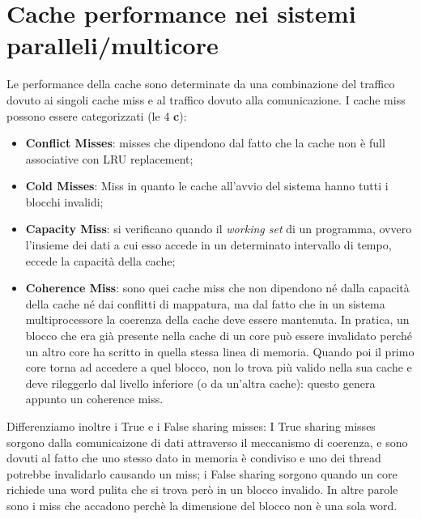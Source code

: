 \section{Cache performance nei sistemi paralleli/multicore}
Le performance della cache sono determinate da una combinazione del traffico dovuto ai singoli cache miss e al traffico dovuto alla comunicazione. I cache miss possono essere categorizzati (le 4 \textbf{c}):
\begin{itemize}
    \item \textbf{Conflict Misses}: misses che dipendono dal fatto che la cache non è full associative con LRU replacement;
    \item \textbf{Cold Misses}: Miss in quanto le cache all'avvio del sistema hanno tutti i blocchi invalidi;
    \item \textbf{Capacity Miss}: si verificano quando il \textit{working set} di un programma, ovvero l'insieme dei dati a cui esso accede in un determinato intervallo di tempo, eccede la capacità della cache;
    \item \textbf{Coherence Miss}: sono quei cache miss che non dipendono né dalla capacità della cache né dai conflitti di mappatura, ma dal fatto che in un sistema multiprocessore la coerenza della cache deve essere mantenuta. In pratica, un blocco che era già presente nella cache di un core può essere invalidato perché un altro core ha scritto in quella stessa linea di memoria. Quando poi il primo core torna ad accedere a quel blocco, non lo trova più valido nella sua cache e deve rileggerlo dal livello inferiore (o da un'altra cache): questo genera appunto un coherence miss.
\end{itemize}

\noindent Differenziamo inoltre i True e i False sharing misses: I True sharing misses sorgono dalla comunicaizone di dati attraverso il meccanismo di coerenza, e sono dovuti al fatto che uno stesso dato in memoria è condiviso e uno dei thread potrebbe invalidarlo causando un miss; i False sharing sorgono quando un core richiede una word pulita che si trova però in un blocco invalido. In altre parole sono i miss che accadono perchè la dimensione del blocco non è una sola word.

\begin{figure}[ht]
    \centering
    \setlength{\fboxrule}{0.5pt} %
    \setlength{\fboxsep}{0pt}    %
\end{figure}